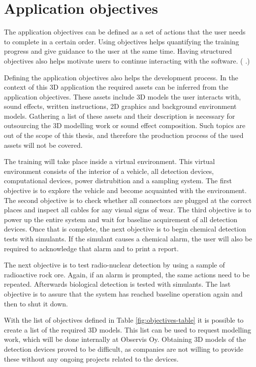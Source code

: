\documentclass[12pt, a4paper,oneside, nocenter]{thesis}
\renewcommand{\citep}[1]{(\citeauthor{#1} \citeyear{#1}.)}
\begin{document}
\section{Application objectives}
The application objectives can be defined as a set of actions that the user needs to complete in a certain order. Using objectives helps quantifying the training progress and give guidance to the user at the same time. Having structured objectives also helps motivate users to continue interacting with the software. \citep{goal-oriented-games}
\par
Defining the application objectives also helps the development process. In the context of this 3D application the required assets can be inferred from the application objectives. These assets include 3D models the user interacts with, sound effects, written instructions, 2D graphics and background environment models. Gathering a list of these assets and their description is necessary for outsourcing the 3D modelling work or sound effect composition. Such topics are out of the scope of this thesis, and therefore the production process of the used assets will not be covered.
\par
The training will take place inside a virtual environment. This virtual environment consists of the interior of a vehicle, all detection devices, computational devices, power distrubition and a sampling system. The first objective is to explore the vehicle and become acquainted with the environment. The second objective is to check whether all connectors are plugged at the correct places and inspect all cables for any visual signs of wear. The third objective is to power up the entire system and wait for baseline acquirement of all detection devices. Once that is complete, the next objective is to begin chemical detection tests with simulants. If the simulant causes a chemical alarm, the user will also be required to acknowledge that alarm and to print a report.
\par
The next objective is to test radio-nuclear detection by using a sample of radioactive rock ore. Again, if an alarm is prompted, the same actions need to be repeated. Afterwards biological detection is tested with simulants. The last objective is to assure that the system has reached baseline operation again and then to shut it down.
\par
With the list of objectives defined in Table \ref{fig:objectives-table} it is possible to create a list of the required 3D models. This list can be used to request modelling work, which will be done internally at Observis Oy. Obtaining 3D models of the detection devices proved to be difficult, as companies are not willing to provide these without any ongoing projects related to the devices.
\end{document}
